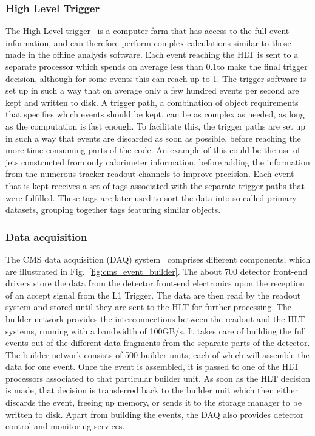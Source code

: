 \subsubsection{High Level Trigger \label{sec:cms_hlt}}

The High Level trigger~\cite{Adam:2005zf} is a computer farm that has access to the full event
information, and can therefore perform complex calculations similar to those made in the offline
analysis software. 
Each event reaching the HLT is sent to a separate processor which spends on average less than
0.1\second to make the final trigger decision, although for some events this can reach up to
1\second. 
The trigger software is set up in such a way that on average only a few hundred events per second
are kept and written to disk. 
A trigger path, a combination of object requirements that specifies which events should
be kept, can be as complex as needed, as long as the computation is fast enough. 
To facilitate this, the trigger paths are set up in such a way that events are discarded as soon as
possible, before reaching the more time consuming parts of the code. 
An example of this could be the use of jets constructed from only calorimeter information, before
adding the information from the numerous tracker readout channels to improve precision. 
Each event that is kept receives a set of tags associated with the separate trigger paths that were
fulfilled. These tags are later used to sort the data into so-called primary datasets, grouping
together tags featuring similar objects. 


\subsubsection{Data acquisition \label{sec:cms_daq}}

The CMS data acquisition (DAQ) system~\cite{Cittolin:578006} comprises different components, which
are illustrated in Fig.~\ref{fig:cms_event_builder}. 
The about 700 detector front-end drivers store the data from the detector front-end electronics upon
the reception of an accept signal from the L1 Trigger. The data are then read by the readout system
and stored until they are sent to the HLT for further processing. 
The builder network provides the interconnections between the readout and the HLT systems, running
with a bandwidth of 100\unit{GB/s}. It takes care of building the full events out of the different
data fragments from the separate parts of the detector. The builder network consists of 500 builder
units, each of which will assemble the data for one event. 
Once the event is assembled, it is passed to one of the HLT processors associated to that particular
builder unit. As soon as the HLT decision is made, that decision is transferred back to the builder
unit which then either discards the event, freeing up memory, or sends it to the storage
manager to be written to disk.
Apart from building the events, the DAQ also provides detector control and monitoring services.

